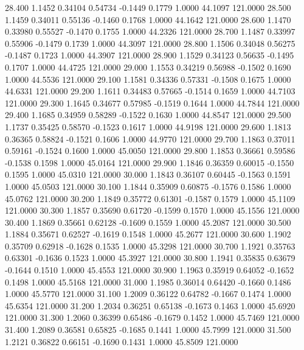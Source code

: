   28.400   1.1452   0.34104   0.54734  -0.1449   0.1779   1.0000  44.1097 121.0000
  28.500   1.1459   0.34011   0.55136  -0.1460   0.1768   1.0000  44.1642 121.0000
  28.600   1.1470   0.33980   0.55527  -0.1470   0.1755   1.0000  44.2326 121.0000
  28.700   1.1487   0.33997   0.55906  -0.1479   0.1739   1.0000  44.3097 121.0000
  28.800   1.1506   0.34048   0.56275  -0.1487   0.1723   1.0000  44.3907 121.0000
  28.900   1.1529   0.34123   0.56635  -0.1495   0.1707   1.0000  44.4725 121.0000
  29.000   1.1553   0.34219   0.56988  -0.1502   0.1690   1.0000  44.5536 121.0000
  29.100   1.1581   0.34336   0.57331  -0.1508   0.1675   1.0000  44.6331 121.0000
  29.200   1.1611   0.34483   0.57665  -0.1514   0.1659   1.0000  44.7103 121.0000
  29.300   1.1645   0.34677   0.57985  -0.1519   0.1644   1.0000  44.7844 121.0000
  29.400   1.1685   0.34959   0.58289  -0.1522   0.1630   1.0000  44.8547 121.0000
  29.500   1.1737   0.35425   0.58570  -0.1523   0.1617   1.0000  44.9198 121.0000
  29.600   1.1813   0.36365   0.58824  -0.1521   0.1606   1.0000  44.9770 121.0000
  29.700   1.1863   0.37011   0.59161  -0.1524   0.1600   1.0000  45.0050 121.0000
  29.800   1.1853   0.36661   0.59586  -0.1538   0.1598   1.0000  45.0164 121.0000
  29.900   1.1846   0.36359   0.60015  -0.1550   0.1595   1.0000  45.0310 121.0000
  30.000   1.1843   0.36107   0.60445  -0.1563   0.1591   1.0000  45.0503 121.0000
  30.100   1.1844   0.35909   0.60875  -0.1576   0.1586   1.0000  45.0762 121.0000
  30.200   1.1849   0.35772   0.61301  -0.1587   0.1579   1.0000  45.1109 121.0000
  30.300   1.1857   0.35690   0.61720  -0.1599   0.1570   1.0000  45.1556 121.0000
  30.400   1.1869   0.35661   0.62128  -0.1609   0.1559   1.0000  45.2087 121.0000
  30.500   1.1884   0.35671   0.62527  -0.1619   0.1548   1.0000  45.2677 121.0000
  30.600   1.1902   0.35709   0.62918  -0.1628   0.1535   1.0000  45.3298 121.0000
  30.700   1.1921   0.35763   0.63301  -0.1636   0.1523   1.0000  45.3927 121.0000
  30.800   1.1941   0.35835   0.63679  -0.1644   0.1510   1.0000  45.4553 121.0000
  30.900   1.1963   0.35919   0.64052  -0.1652   0.1498   1.0000  45.5168 121.0000
  31.000   1.1985   0.36014   0.64420  -0.1660   0.1486   1.0000  45.5770 121.0000
  31.100   1.2009   0.36122   0.64782  -0.1667   0.1474   1.0000  45.6354 121.0000
  31.200   1.2034   0.36251   0.65138  -0.1673   0.1463   1.0000  45.6920 121.0000
  31.300   1.2060   0.36399   0.65486  -0.1679   0.1452   1.0000  45.7469 121.0000
  31.400   1.2089   0.36581   0.65825  -0.1685   0.1441   1.0000  45.7999 121.0000
  31.500   1.2121   0.36822   0.66151  -0.1690   0.1431   1.0000  45.8509 121.0000

